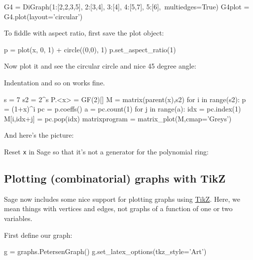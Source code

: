 \documentclass{article}
\begin{document}
\begin{center}
\end{center}


\begin{sageblock}
G4 = DiGraph({1:[2,2,3,5], 2:[3,4], 3:[4], 4:[5,7], 5:[6]},\
             multiedges=True)
G4plot = G4.plot(layout='circular')
\end{sageblock}


To fiddle with aspect ratio, first save the plot object:

\begin{sageblock}
p = plot(x, 0, 1) + circle((0,0), 1)
p.set_aspect_ratio(1)
\end{sageblock}

Now plot it and see the circular circle and nice 45 degree angle:


Indentation and so on works fine.
\begin{sageblock}
s     = 7
s2    = 2^s
P.<x> = GF(2)[]
M     = matrix(parent(x),s2)
for i in range(s2):
   p  = (1+x)^i
   pc = p.coeffs()
   a  = pc.count(1)
   for j in range(a):
       idx        = pc.index(1)
       M[i,idx+j] = pc.pop(idx)
matrixprogram = matrix_plot(M,cmap='Greys')
\end{sageblock}
And here's the picture:


Reset \texttt{x} in Sage so that it's not a generator for the polynomial
ring: \sage{var('x')}

\subsection{Plotting (combinatorial) graphs with TikZ}
\label{sec:plotting-graphs-with}

Sage now includes some nice support for plotting graphs using
\href{http://www.texample.net/tikz/}{TikZ}. Here, we mean things with
vertices and edges, not graphs of a function of one or two variables.

First define our graph:

\begin{sageblock}
g = graphs.PetersenGraph()
g.set_latex_options(tkz_style='Art')
\end{sageblock}
\end{document}
